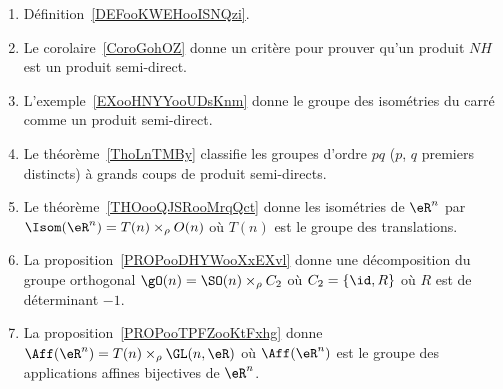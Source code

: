 
	\label{THEMEooProduitSemiDirectGroupes}
\begin{enumerate}
	\item
	      Définition~\ref{DEFooKWEHooISNQzi}.         %
	\item
	      Le corolaire~\ref{CoroGohOZ} donne un critère pour prouver qu'un produit \( NH\) est un produit semi-direct.
	\item
	      L'exemple~\ref{EXooHNYYooUDsKnm} donne le groupe des isométries du carré comme un produit semi-direct.
	\item
	      Le théorème~\ref{ThoLnTMBy} classifie les groupes d'ordre \( pq\) (\( p\), \( q\) premiers distincts) à grands coups de produit semi-directs.
	\item
	      Le théorème~\ref{THOooQJSRooMrqQct} donne les isométries de \( \eR^n\) par \( \Isom(\eR^n)=T(n)\times_{\rho} O(n)\) où \( T(n)\) est le groupe des translations.
	\item
	      La proposition~\ref{PROPooDHYWooXxEXvl} donne une décomposition du groupe orthogonal \( \gO(n)=\SO(n)\times_{\rho} C_2\) où \( C_2=\{ \id,R \}\) où \( R\) est de déterminant \( -1\).
	\item
	      La proposition~\ref{PROPooTPFZooKtFxhg} donne \( \Aff(\eR^n)=T(n)\times_{\rho}\GL(n,\eR)\) où \( \Aff(\eR^n)\) est le groupe des applications affines bijectives de \( \eR^n\).
\end{enumerate}

